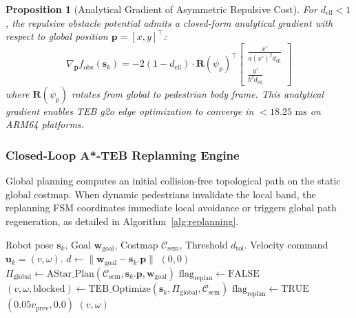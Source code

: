 \documentclass[journal]{IEEEtran}
\newtheorem{proposition}{Proposition}
\begin{document}
\begin{proposition}[Analytical Gradient of Asymmetric Repulsive Cost]
For $d_{\text{ell}} < 1$, the repulsive obstacle potential admits a closed-form analytical gradient with respect to global position $\mathbf{p} = [x, y]^\top$:
\begin{equation}
\nabla_{\mathbf{p}} f_{\text{obs}}(\mathbf{s}_k) = -2 (1 - d_{\text{ell}}) \cdot \mathbf{R}(\psi_p)^\top \begin{bmatrix} \frac{x'}{a(x')^2 d_{\text{ell}}} \\ \frac{y'}{b^2 d_{\text{ell}}} \end{bmatrix}
\end{equation}
where $\mathbf{R}(\psi_p)$ rotates from global to pedestrian body frame. This analytical gradient enables TEB g2o edge optimization to converge in $<18.25\text{ ms}$ on ARM64 platforms.
\end{proposition}

\subsubsection{Closed-Loop A*-TEB Replanning Engine}
Global planning computes an initial collision-free topological path on the static global costmap. When dynamic pedestrians invalidate the local band, the replanning FSM coordinates immediate local avoidance or triggers global path regeneration, as detailed in Algorithm~\ref{alg:replanning}.

\begin{algorithm}[!h]
\caption{Closed-Loop A*-TEB Replanning Engine}
\label{alg:replanning}
\begin{algorithmic}[1]
\REQUIRE Robot pose $\mathbf{s}_k$, Goal $\mathbf{w}_{\text{goal}}$, Costmap $\mathcal{C}_{\text{sem}}$, Threshold $d_{\text{tol}}$.
\ENSURE Velocity command $\mathbf{u}_k = (v, \omega)$.
\STATE $d \leftarrow \|\mathbf{w}_{\text{goal}} - \mathbf{s}_k.\mathbf{p}\|$
    \RETURN $(0, 0)$ 
\ENDIF
{}
    \STATE $\Pi_{\text{global}} \leftarrow \text{AStar\_Plan}(\mathcal{C}_{\text{sem}}, \mathbf{s}_k.\mathbf{p}, \mathbf{w}_{\text{goal}})$
    \STATE $\text{flag}_{\text{replan}} \leftarrow \text{FALSE}$
\ENDIF
\STATE $(v, \omega, \text{blocked}) \leftarrow \text{TEB\_Optimize}(\mathbf{s}_k, \Pi_{\text{global}}, \mathcal{C}_{\text{sem}})$
    \STATE $\text{flag}_{\text{replan}} \leftarrow \text{TRUE}$
    \RETURN $(0.05 v_{\text{prev}}, 0.0)$ 
\ELSE
    \RETURN $(v, \omega)$
\ENDIF
\end{algorithmic}
\end{algorithm}
\end{document}
